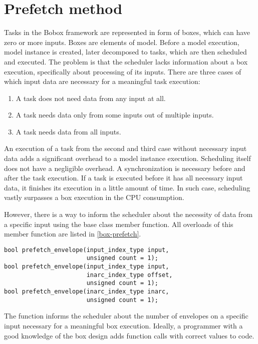 \chapter{Prefetch method}
\label{prefetch}
Tasks in the Bobox framework are represented in form of boxes, which can have zero or more inputs. Boxes are elements of model. Before a model execution, model instance is created, later decomposed to tasks, which are then scheduled and executed. The problem is that the scheduler lacks information about a box execution, specifically about processing of its inputs. There are three cases of which input data are necessary for a meaningful task execution:

\begin{enumerate}
\item A task does not need data from any input at all.
\item A task needs data only from some inputs out of multiple inputs.
\item A task needs data from all inputs.
\end{enumerate}

An execution of a task from the second and third case without necessary input data adds a significant overhead to a model instance execution. Scheduling itself does not have a negligible overhead. A synchronization is necessary before and after the task execution. If a task is executed before it has all necessary input data, it finishes its execution in a little amount of time. In such case, scheduling vastly surpasses a box execution in the CPU consumption.

However, there is a way to inform the scheduler about the necessity of data from a specific input using the  base class member function. All overloads of this member function are listed in \ref{box-prefetch}.

\begin{lstlisting}[caption={\code{basic\_box} prefetch member function overloads.},label={box-prefetch}]
bool prefetch_envelope(input_index_type input,
                       unsigned count = 1);
bool prefetch_envelope(input_index_type input,
                       inarc_index_type offset,
                       unsigned count = 1);
bool prefetch_envelope(inarc_index_type inarc,
                       unsigned count = 1);
\end{lstlisting}

The function informs the scheduler about the number of envelopes on a specific input necessary for a meaningful box execution. Ideally, a programmer with a good knowledge of the box design adds function calls with correct values to code.

